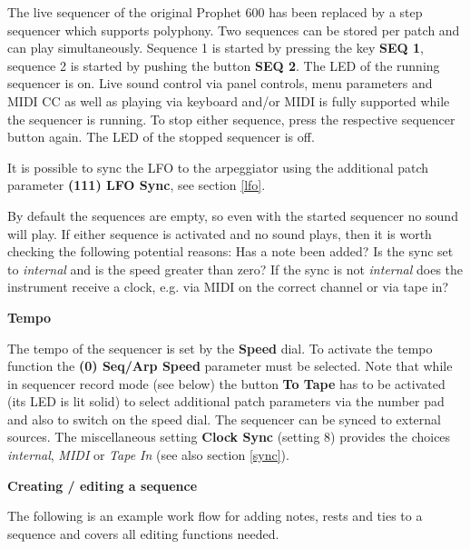 The live sequencer of the original Prophet 600 has been replaced by a step sequencer which supports polyphony. Two sequences can be stored per patch and can play simultaneously. Sequence 1 is started by pressing the key \textbf{SEQ 1}, sequence 2 is started by pushing the button \textbf{SEQ 2}. The LED of the running sequencer is on. Live sound control via panel controls, menu parameters and MIDI CC as well as playing via keyboard and/or MIDI is fully supported while the sequencer is running. To stop either sequence, press the respective sequencer button again. The LED of the stopped sequencer is off. 

It is possible to sync the LFO to the arpeggiator using the additional patch parameter \textbf{(111) LFO Sync}, see section \ref{lfo}.

By default the sequences are empty, so even with the started sequencer no sound will play. If either sequence is activated and no sound plays, then it is worth checking the following potential reasons: Has a note been added? Is the sync set to \textit{internal} and is the speed greater than zero? If the sync is not \textit{internal} does the instrument receive a clock, e.g. via MIDI on the correct channel or via tape in?

\textbf{Tempo}

The tempo of the sequencer is set by the \textbf{Speed} dial. To activate the tempo function the \textbf{(0) Seq/Arp Speed} parameter must be selected. Note that while in sequencer record mode (see below) the button \textbf{To Tape} has to be activated (its LED is lit solid) to select additional patch parameters via the number pad and also to switch on the speed dial. The  sequencer can be synced to external sources. The miscellaneous setting \textbf{Clock Sync} (setting 8) provides the choices \textit{internal}, \textit{MIDI} or \textit{Tape In} (see also section \ref{sync}).

\textbf{Creating / editing a sequence}

The following is an example work flow for adding notes, rests and ties to a sequence and covers all editing functions needed. 

